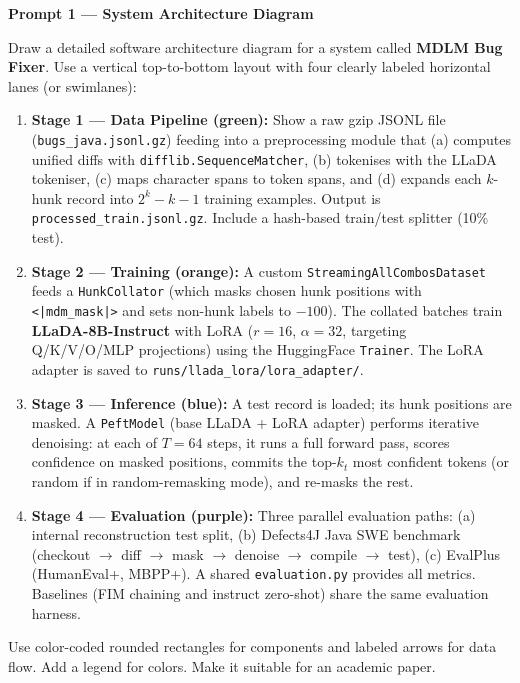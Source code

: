 \documentclass[11pt,a4paper]{article}
\begin{document}
\medskip

\begin{mdframed}[linecolor=blue!60, linewidth=1.2pt, roundcorner=6pt, backgroundcolor=blue!4]
\textbf{Prompt 1 — System Architecture Diagram}

\medskip
Draw a detailed software architecture diagram for a system called \textbf{MDLM Bug Fixer}. Use a vertical top-to-bottom layout with four clearly labeled horizontal lanes (or swimlanes):

\begin{enumerate}
  \item \textbf{Stage 1 — Data Pipeline (green):} Show a raw gzip JSONL file (\texttt{bugs\_java.jsonl.gz}) feeding into a preprocessing module that (a) computes unified diffs with \texttt{difflib.SequenceMatcher}, (b) tokenises with the LLaDA tokeniser, (c) maps character spans to token spans, and (d) expands each $k$-hunk record into $2^k - k - 1$ training examples. Output is \texttt{processed\_train.jsonl.gz}. Include a hash-based train/test splitter (10\% test).
  
  \item \textbf{Stage 2 — Training (orange):} A custom \texttt{StreamingAllCombosDataset} feeds a \texttt{HunkCollator} (which masks chosen hunk positions with \texttt{<|mdm\_mask|>} and sets non-hunk labels to $-100$). The collated batches train \textbf{LLaDA-8B-Instruct} with LoRA ($r=16$, $\alpha=32$, targeting Q/K/V/O/MLP projections) using the HuggingFace \texttt{Trainer}. The LoRA adapter is saved to \texttt{runs/llada\_lora/lora\_adapter/}.
  
  \item \textbf{Stage 3 — Inference (blue):} A test record is loaded; its hunk positions are masked. A \texttt{PeftModel} (base LLaDA + LoRA adapter) performs iterative denoising: at each of $T=64$ steps, it runs a full forward pass, scores confidence on masked positions, commits the top-$k_t$ most confident tokens (or random if in random-remasking mode), and re-masks the rest.
  
  \item \textbf{Stage 4 — Evaluation (purple):} Three parallel evaluation paths: (a) internal reconstruction test split, (b) Defects4J Java SWE benchmark (checkout $\to$ diff $\to$ mask $\to$ denoise $\to$ compile $\to$ test), (c) EvalPlus (HumanEval+, MBPP+). A shared \texttt{evaluation.py} provides all metrics. Baselines (FIM chaining and instruct zero-shot) share the same evaluation harness.
\end{enumerate}

Use color-coded rounded rectangles for components and labeled arrows for data flow. Add a legend for colors. Make it suitable for an academic paper.
\end{mdframed}
\end{document}
